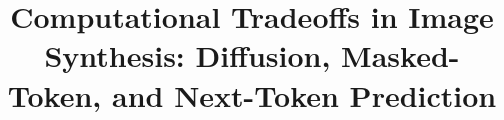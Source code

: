 \title{Computational Tradeoffs in Image Synthesis: Diffusion, Masked-Token, and Next-Token Prediction}



\maketitle

\newcommand{\aereconstructiontable}{
\begin{table}[t]
\begin{minipage}{.5\textwidth}
  \centering
  \begin{tabular}{lccc}
    \toprule
    Regularizer & Latent space capacity & rFID ($\downarrow$) \\
    \midrule
    KL & 16 channels & 1.060 \\
    KL & 8 channels & 1.560 \\
    KL$_{es}$ & 8 channels & 2.856 \\
    KL & 4 channels & 2.410 \\
    LFQ & 16384 vocabulary & 2.784 \\
    \bottomrule \\
  \end{tabular}
  \caption{\textbf{Autoencoders.} Reconstruction metrics for differently regularized and trained autoencoders (downsampling $f=8$). "es" is early stopping to match the LFQ autoencoder. \vspace{-1em}}
  \label{tab:aereconstructiontable}
  \end{minipage}%
  \hspace{0.2cm}
  \begin{minipage}{.5\textwidth}
  \centering
    \small
    \begin{tabular}{l c c c c c}
    \toprule
    Model size & Layers $N$ & Hidden size $d$ &  Heads \\
    \midrule 
    S  &   12   &      768    &   12  \\
    M  &    24   &      1024    &   16  \\
    L &    24  &       1536     &   16  \\
    XL & 32 & 2304 & 32 \\
    \bottomrule \\
    \end{tabular}
    \caption{\textbf{Transformer configurations.} Base transformer hyperparameters for models we train. Common across all approaches}
    \label{tab:tfsizetable}
  \end{minipage}
  \vspace{-1em}
\end{table}
}

